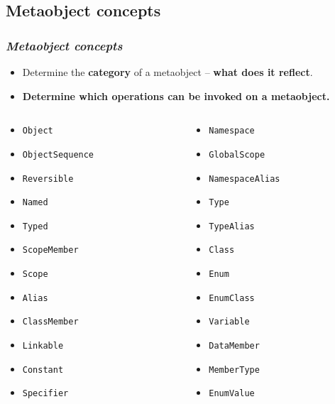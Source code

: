 \documentclass[compress,table,xcolor=table]{beamer}
\begin{document}
\subsection{Metaobject concepts}
\begin{frame}
\frametitle{{\em Metaobject concepts}}
  \begin{itemize}
    \item Determine the \textbf{category} of a metaobject -- \textbf{what does it reflect}.
    \item \large \textbf{Determine which operations can be invoked on a metaobject.}
  \end{itemize}
  \begin{columns}
    \scriptsize
    \begin{column}{0.35\textwidth}
      \begin{itemize}
      \setlength\itemsep{0.1em}
      \item \texttt{Object}
      \item \texttt{ObjectSequence}
      \item \texttt{Reversible}
      \item \texttt{Named}
      \item \texttt{Typed}
      \item \texttt{ScopeMember}
      \item \texttt{Scope}
      \item \texttt{Alias}
      \item \texttt{ClassMember}
      \item \texttt{Linkable}
      \item \texttt{Constant}
      \item \texttt{Specifier}
      \end{itemize}
    \end{column}
    \begin{column}{0.35\textwidth}
      \begin{itemize}
      \setlength\itemsep{0.1em}
      \item \texttt{Namespace}
      \item \texttt{GlobalScope}
      \item \texttt{NamespaceAlias}
      \item \texttt{Type}
      \item \texttt{TypeAlias}
      \item \texttt{Class}
      \item \texttt{Enum}
      \item \texttt{EnumClass}
      \item \texttt{Variable}
      \item \texttt{DataMember}
      \item \texttt{MemberType}
      \item \texttt{EnumValue}
      \end{itemize}
    \end{column}
  \end{columns}
\end{frame}
\end{document}
